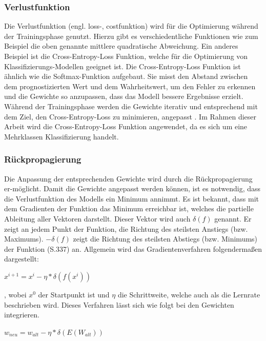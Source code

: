 \documentclass[12pt]{scrreprt}
\begin{document}
\subsubsection{Verlustfunktion}

Die Verlustfunktion (engl. loss-, costfunktion) wird für die Optimierung während der Trainingsphase genutzt. Hierzu gibt es verschiedentliche Funktionen wie zum Beispiel die oben genannte mittlere quadratische Abweichung. Ein anderes Beispiel ist die Cross-Entropy-Loss Funktion, welche für die Optimierung von Klassifizierungs-Modellen geeignet ist. Die Cross-Entropy-Loss Funktion ist ähnlich wie die Softmax-Funktion aufgebaut. Sie misst den Abstand zwischen dem prognostizierten Wert und dem Wahrheitswert, um den Fehler zu erkennen und die Gewichte so anzupassen, dass das Modell bessere Ergebnisse erzielt. Während der Trainingsphase werden die Gewichte iterativ und entsprechend mit dem Ziel, den Cross-Entropy-Loss zu minimieren, angepasst \cite{Mahmood2018}. Im Rahmen dieser Arbeit wird die Cross-Entropy-Loss Funktion angewendet, da es sich um eine Mehrklassen Klassifizierung handelt.

\subsubsection{Rückpropagierung}

Die Anpassung der entsprechenden Gewichte wird durch die Rückpropagierung er-möglicht. Damit die Gewichte angepasst werden können, ist es notwendig, dass die Verlustfunktion des Modells ein Minimum annimmt. Es ist bekannt, dass mit dem Gradienten der Funktion das Minimum erreichbar ist, welches die partielle Ableitung aller Vektoren darstellt. Dieser Vektor wird auch $\delta(f)$ genannt. Er zeigt an jedem Punkt der Funktion, die Richtung des steilsten Anstiegs  (bzw. Maximums). $-\delta(f)$ zeigt die Richtung des steilsten Abstiegs (bzw. Minimums) der Funktion \cite{Vogl2021} (S.337) an. Allgemein wird das Gradientenverfahren folgendermaßen dargestellt:\\

\begin{center}
	$x^{i+1} = x^{i} - \eta * \delta(f(x^{i}))$
\end{center}

, wobei $x^{0}$ der Startpunkt ist und $\eta$ die Schrittweite, welche auch als die Lernrate beschrieben wird. Dieses Verfahren lässt sich wie folgt bei den Gewichten integrieren.

\begin{center}
	$w_{neu} = w_{alt} - \eta * \delta (E(W_{alt}))$
\end{center}
\end{document}
